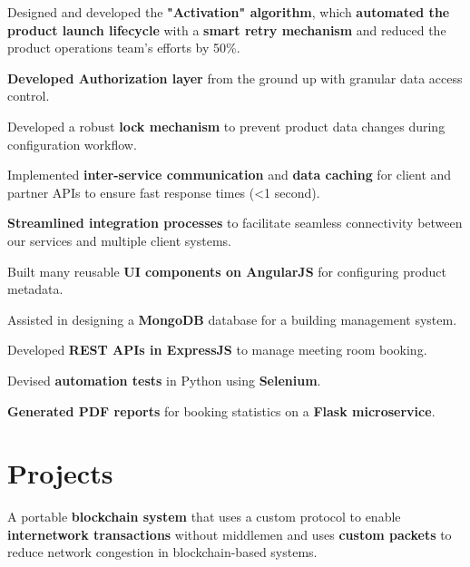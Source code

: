 \documentclass[]{resume-openfont}
\begin{document}
\begin{minipage}[t]{0.66\textwidth}
\vspace{\topsep} %
\begin{tightemize}
\item Designed and developed the \textbf{"Activation" algorithm}, which \textbf{automated the product launch lifecycle} with a \textbf{smart retry mechanism} and reduced the product operations team's efforts by 50\%.
\item \textbf{Developed Authorization layer} from the ground up with granular data access control.
\item Developed a robust \textbf{lock mechanism} to prevent product data changes during configuration workflow.
\item Implemented \textbf{inter-service communication} and \textbf{data caching} for client and partner APIs to ensure fast response times (<1 second).
\item \textbf{Streamlined integration processes} to facilitate seamless connectivity between our services and multiple client systems.
\item Built many reusable \textbf{UI components on AngularJS} for configuring product metadata.
\end{tightemize}
\sectionsep

\vspace{\topsep} %
\begin{tightemize}
\item Assisted in designing a \textbf{MongoDB} database  for a building management system.
\item Developed \textbf{REST APIs in ExpressJS} to manage meeting room booking.
\item Devised \textbf{automation tests} in Python using \textbf{Selenium}.
\item  \textbf{Generated PDF reports} for booking statistics on a \textbf{Flask microservice}.
\end{tightemize}
\sectionsep



\section{Projects}
A portable \textbf{blockchain system} that uses a custom protocol to enable \textbf{internetwork transactions} without middlemen and uses \textbf{custom packets} to reduce network congestion in blockchain-based systems.
\sectionsep


\end{minipage}
\end{document}
